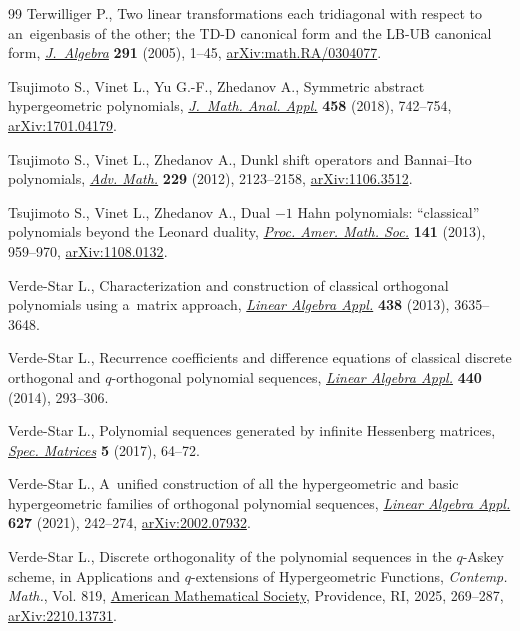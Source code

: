 \begin{thebibliography}{99}
Terwilliger P., Two linear transformations each tridiagonal with respect to
 an~eigenbasis of the other; the {TD}-{D} canonical form and the {LB}-{UB}
 canonical form,
 \href{https://doi.org/10.1016/j.jalgebra.2005.05.033}{\textit{J.~Algebra}}
 \textbf{291} (2005), 1--45,
 \href{http://arxiv.org/abs/math.RA/0304077}{arXiv:math.RA/0304077}.

Tsujimoto S., Vinet L., Yu G.-F., Zhedanov A., Symmetric abstract hypergeometric
 polynomials,
 \href{https://doi.org/10.1016/j.jmaa.2017.09.033}{\textit{J.~Math. Anal.
 Appl.}} \textbf{458} (2018), 742--754,
 \href{http://arxiv.org/abs/1701.04179}{arXiv:1701.04179}.

Tsujimoto S., Vinet L., Zhedanov A., Dunkl shift operators and {B}annai--{I}to
 polynomials, \href{https://doi.org/10.1016/j.aim.2011.12.020}{\textit{Adv.
 Math.}} \textbf{229} (2012), 2123--2158,
 \href{http://arxiv.org/abs/1106.3512}{arXiv:1106.3512}.

Tsujimoto S., Vinet L., Zhedanov A., Dual {$-1$} {H}ahn polynomials:
 ``classical'' polynomials beyond the {L}eonard duality,
 \href{https://doi.org/10.1090/S0002-9939-2012-11469-8}{\textit{Proc. Amer.
 Math. Soc.}} \textbf{141} (2013), 959--970,
 \href{http://arxiv.org/abs/1108.0132}{arXiv:1108.0132}.

Verde-Star L., Characterization and construction of classical orthogonal
 polynomials using a~matrix approach,
 \href{https://doi.org/10.1016/j.laa.2013.01.014}{\textit{Linear Algebra
 Appl.}} \textbf{438} (2013), 3635--3648.

Verde-Star L., Recurrence coefficients and difference equations of classical
 discrete orthogonal and {$q$}-orthogonal polynomial sequences,
 \href{https://doi.org/10.1016/j.laa.2013.10.051}{\textit{Linear Algebra
 Appl.}} \textbf{440} (2014), 293--306.

Verde-Star L., Polynomial sequences generated by infinite {H}essenberg
 matrices, \href{https://doi.org/10.1515/spma-2017-0002}{\textit{Spec.
 Matrices}} \textbf{5} (2017), 64--72.

Verde-Star L., A~unified construction of all the hypergeometric and basic
 hypergeometric families of orthogonal polynomial sequences,
 \href{https://doi.org/10.1016/j.laa.2021.06.012}{\textit{Linear Algebra
 Appl.}} \textbf{627} (2021), 242--274,
 \href{http://arxiv.org/abs/2002.07932}{arXiv:2002.07932}.

Verde-Star L., Discrete orthogonality of the polynomial sequences in the
 {$q$}-{A}skey scheme, in Applications and {$q$}-extensions of Hypergeometric
 Functions, \textit{Contemp. Math.}, Vol. 819,
 \href{https://doi.org/10.1090/conm/819/16398}{American Mathematical Society},
 Providence, RI, 2025, 269--287,
 \href{http://arxiv.org/abs/2210.13731}{arXiv:2210.13731}.


\end{thebibliography}
